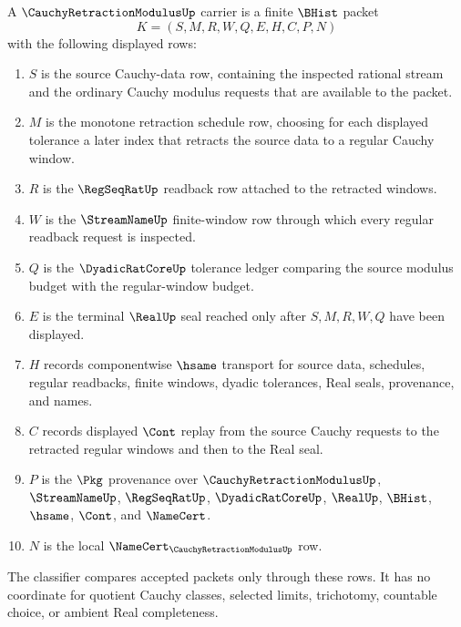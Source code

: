 \begin{definition}
\label{def:cauchy-retraction-modulus-carrier}
A $\CauchyRetractionModulusUp$ carrier is a finite $\BHist$ packet
$$
K=(S,M,R,W,Q,E,H,C,P,N)
$$
with the following displayed rows:
\begin{enumerate}
\item $S$ is the source Cauchy-data row, containing the inspected rational stream and the ordinary Cauchy modulus requests that are available to the packet.
\item $M$ is the monotone retraction schedule row, choosing for each displayed tolerance a later index that retracts the source data to a regular Cauchy window.
\item $R$ is the $\RegSeqRatUp$ readback row attached to the retracted windows.
\item $W$ is the $\StreamNameUp$ finite-window row through which every regular readback request is inspected.
\item $Q$ is the $\DyadicRatCoreUp$ tolerance ledger comparing the source modulus budget with the regular-window budget.
\item $E$ is the terminal $\RealUp$ seal reached only after $S,M,R,W,Q$ have been displayed.
\item $H$ records componentwise $\hsame$ transport for source data, schedules, regular readbacks, finite windows, dyadic tolerances, Real seals, provenance, and names.
\item $C$ records displayed $\Cont$ replay from the source Cauchy requests to the retracted regular windows and then to the Real seal.
\item $P$ is the $\Pkg$ provenance over $\CauchyRetractionModulusUp$, $\StreamNameUp$, $\RegSeqRatUp$, $\DyadicRatCoreUp$, $\RealUp$, $\BHist$, $\hsame$, $\Cont$, and $\NameCert$.
\item $N$ is the local $\NameCert_{\CauchyRetractionModulusUp}$ row.
\end{enumerate}
The classifier compares accepted packets only through these rows. It has no coordinate for quotient Cauchy classes, selected limits, trichotomy, countable choice, or ambient Real completeness.
\end{definition}

